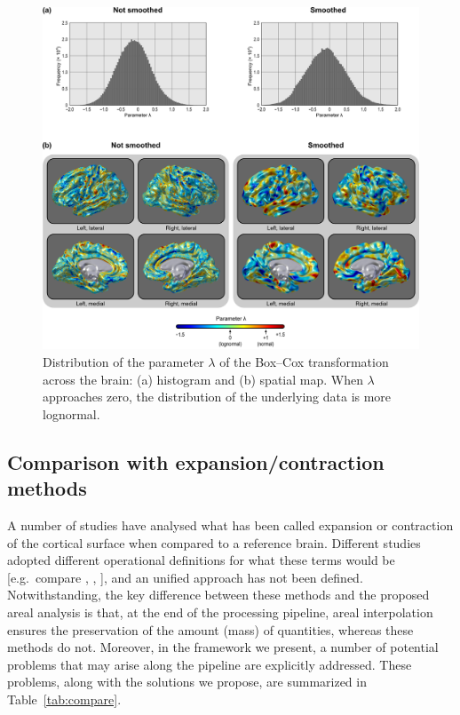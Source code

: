 \begin{figure}[!p]  %
\centering
\includegraphics[width=14cm]{images/boxcox.png}
\caption[Spatial distribution of the parameter $\lambda$.]{Distribution of the parameter $\lambda$ of the Box--Cox transformation across the brain: (a) histogram and (b) spatial map. When $\lambda$ approaches zero, the distribution of the underlying data is more lognormal.}
\label{fig:boxcox}
\end{figure}

\subsection{Comparison with expansion/contraction methods}

A number of studies have analysed what has been called expansion or contraction of the cortical surface when compared to a reference brain. Different studies adopted different operational definitions for what these terms would be [e.g.\ compare \citet{Joyner2009}, \citet{Sun2009}, \citet{Hill2010}], and an unified approach has not been defined. Notwithstanding, the key difference between these methods and the proposed areal analysis is that, at the end of the processing pipeline, areal interpolation ensures the preservation of the amount (mass) of quantities, whereas these methods do not. Moreover, in the framework we present, a number of potential problems that may arise along the pipeline are explicitly addressed. These problems, along with the solutions we propose, are summarized in Table~\ref{tab:compare}.

